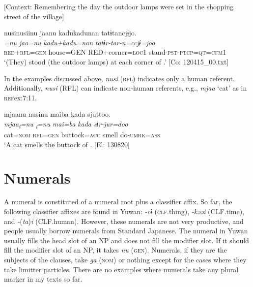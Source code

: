 \ea \label{ex:7:10}  [Context: Remembering the day the outdoor lamps were set in the shopping street of the village]

\glll  nusinusiinu  jaanu  kadukadunan  tatɨtancjɨjo.\\
\textit{=nu}  \textit{jaa=nu}  \textit{kadu+kadu=nan}  \textit{tatɨr-tar-n=ccjɨ=joo}\\
\textsc{red}+\textsc{rfl}=\textsc{gen}  house=GEN  RED+corner=\textsc{loc}1  stand-\textsc{pst}-\textsc{ptcp}=\textsc{qt}=\textsc{cfm}1\\
\glt ‘(They) stood (the outdoor lamps) at each corner of .’ [Co: 120415\_00.txt]
\z

  In the examples discussed above, \textit{nusi} (\textsc{rfl}) indicates only a human referent. Additionally, \textit{nusi} (RFL) can indicate non-human referents, e.g., \textit{mjaa} ‘cat’ as in \textsc{ref}{ex:7:11}.

\ea \label{ex:7:11}  %
\glll  mjaanu  nusinu  maiba  kada  sjuttoo.\\
\textit{mjaa\textsubscript{i}}\textit{=nu}  \textit{\textsubscript{i}}\textit{=nu}  \textit{mai=ba}  \textit{kada}  \textit{sɨr-jur=doo}\\
cat=\textsc{nom}  \textsc{rfl}=\textsc{gen}  buttock=\textsc{acc}  smell  do-\textsc{umrk}=\textsc{ass}\\
\glt ‘A cat smells the buttock of . [El: 130820]
\z

\section{Numerals}

A numeral is constituted of a numeral root plus a classifier affix. So far, the following classifier affixes are found in Yuwan: \textit{{}-cɨ} (\textsc{clf}.thing), \textit{{}-kəəi} (CLF.time), and \textit{{}-}(\textit{ta})\textit{i} (CLF.human). However, these numerals are not very productive, and people usually borrow numerals from Standard Japanese. The numeral in Yuwan usually fills the head slot of an NP and does not fill the modifier slot. If it should fill the modifier slot of an NP, it takes \textit{nu} (\textsc{gen}). Numerals, if they are the subjects of the clauses, take \textit{ga} (\textsc{nom}) or nothing except for the cases where they take limitter particles. There are no examples where numerals take any plural marker in my texts so far.

